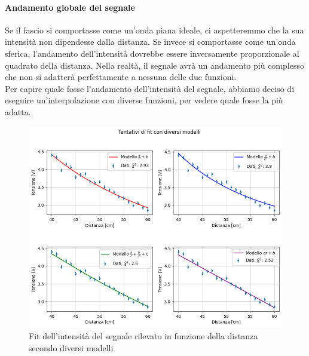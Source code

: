 \documentclass[letterpaper,12pt]{article}
\begin{document}
\paragraph*{Andamento globale del segnale}
Se il fascio si comportasse come un'onda piana ideale, ci aspetteremmo che la sua intensità non dipendesse dalla distanza.
Se invece si comportasse come un'onda sferica, l'andamento dell'intensità dovrebbe essere inversamente proporzionale
al quadrato della distanza. Nella realtà, il segnale avrà un andamento più complesso che non si adatterà perfettamente
a nessuna delle due funzioni.\\
Per capire quale fosse l'andamento dell'intensità del segnale, abbiamo deciso di eseguire un'interpolazione con diverse funzioni,
per vedere quale fosse la più adatta.\\

\begin{figure}[h!]
	\centering
	\includegraphics[width = \textwidth]{fit_distanza_vari_modelli.png}
	\caption{Fit dell'intensità del segnale rilevato in funzione della distanza secondo diversi modelli}
	\label{fig:fit_distanza_vari_modelli}
\end{figure}
\end{document}
